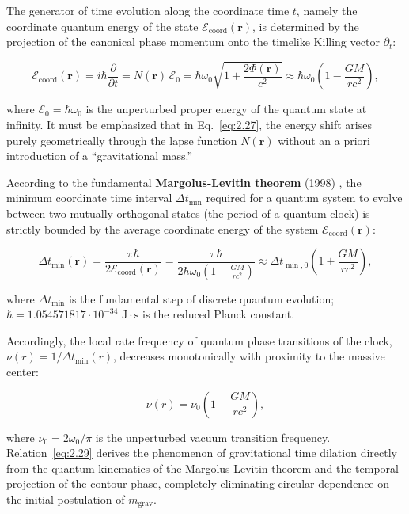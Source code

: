 \documentclass[11pt,a4paper]{article}
\theoremstyle{definition}
\begin{document}
The generator of time evolution along the coordinate time $t$, namely the coordinate quantum energy of the state $\mathcal{E}_{\text{coord}}(\mathbf{r})$, is determined by the projection of the canonical phase momentum onto the timelike Killing vector $\partial_t$:

\begin{equation}\label{eq:2.27}\tag{2.27}
\mathcal{E}_{\text{coord}}(\mathbf{r}) = i\hbar \frac{\partial}{\partial t} = N(\mathbf{r}) \, \mathcal{E}_0 = \hbar \omega_0 \sqrt{1 + \frac{2\Phi(\mathbf{r})}{c^2}} \approx \hbar \omega_0 \left( 1 - \frac{GM}{r c^2} \right),
\end{equation}

where $\mathcal{E}_0 = \hbar \omega_0$ is the unperturbed proper energy of the quantum state at infinity. It must be emphasized that in Eq.~\eqref{eq:2.27}, the energy shift arises purely geometrically through the lapse function $N(\mathbf{r})$ without an a priori introduction of a ``gravitational mass.''

According to the fundamental \textbf{Margolus-Levitin theorem} (1998) \cite{ref16}, the minimum coordinate time interval $\Delta t_{\min}$ required for a quantum system to evolve between two mutually orthogonal states (the period of a quantum clock) is strictly bounded by the average coordinate energy of the system $\mathcal{E}_{\text{coord}}(\mathbf{r})$:

\begin{equation}\label{eq:2.28}\tag{2.28}
\Delta t_{\min}(\mathbf{r}) = \frac{\pi \hbar}{2 \mathcal{E}_{\text{coord}}(\mathbf{r})} = \frac{\pi \hbar}{2 \hbar \omega_0 \left( 1 - \frac{GM}{r c^2} \right)} \approx \Delta t_{\min, 0} \left( 1 + \frac{GM}{r c^2} \right),
\end{equation}

where $\Delta t_{\min}$ is the fundamental step of discrete quantum evolution;  
$\hbar = 1.054571817 \cdot 10^{-34}\text{ J}\cdot\text{s}$ is the reduced Planck constant.

Accordingly, the local rate frequency of quantum phase transitions of the clock, $\nu(r) = 1/\Delta t_{\min}(r)$, decreases monotonically with proximity to the massive center:

\begin{equation}\label{eq:2.29}\tag{2.29}
\nu(r) = \nu_0 \left( 1 - \frac{GM}{r c^2} \right),
\end{equation}

where $\nu_0 = 2 \omega_0 / \pi$ is the unperturbed vacuum transition frequency. Relation~\eqref{eq:2.29} derives the phenomenon of gravitational time dilation directly from the quantum kinematics of the Margolus-Levitin theorem and the temporal projection of the contour phase, completely eliminating circular dependence on the initial postulation of $m_{\text{grav}}$.
\end{document}
